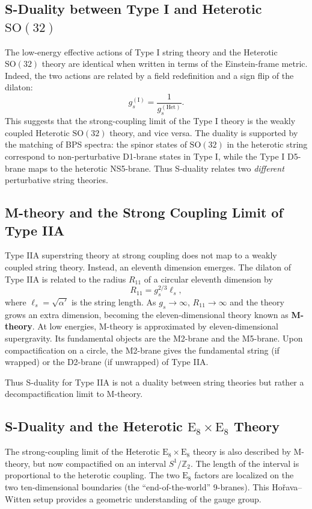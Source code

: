 \documentclass[11pt]{article}
\begin{document}
\subsection{S-Duality between Type I and Heterotic $\mathrm{SO}(32)$}
The low-energy effective actions of Type I string theory and the Heterotic $\mathrm{SO}(32)$ theory are identical when written in terms of the Einstein-frame metric. Indeed, the two actions are related by a field redefinition and a sign flip of the dilaton:
\begin{equation}
    g_s^{\mathrm{(I)}} = \frac{1}{g_s^{\mathrm{(Het)}}}.
\end{equation}
This suggests that the strong-coupling limit of the Type I theory is the weakly coupled Heterotic $\mathrm{SO}(32)$ theory, and vice versa. The duality is supported by the matching of BPS spectra: the spinor states of $\mathrm{SO}(32)$ in the heterotic string correspond to non-perturbative D1-brane states in Type I, while the Type I D5-brane maps to the heterotic NS5-brane. Thus S-duality relates two \textit{different} perturbative string theories.

\subsection{M-theory and the Strong Coupling Limit of Type IIA}
Type IIA superstring theory at strong coupling does not map to a weakly coupled string theory. Instead, an eleventh dimension emerges. The dilaton of Type IIA is related to the radius $R_{11}$ of a circular eleventh dimension by
\begin{equation}
    R_{11} = g_s^{2/3} \ell_s,
\end{equation}
where $\ell_s = \sqrt{\alpha'}$ is the string length. As $g_s \to \infty$, $R_{11} \to \infty$ and the theory grows an extra dimension, becoming the eleven-dimensional theory known as \textbf{M-theory}. At low energies, M-theory is approximated by eleven-dimensional supergravity. Its fundamental objects are the M2-brane and the M5-brane. Upon compactification on a circle, the M2-brane gives the fundamental string (if wrapped) or the D2-brane (if unwrapped) of Type IIA.

Thus S-duality for Type IIA is not a duality between string theories but rather a decompactification limit to M-theory.

\subsection{S-Duality and the Heterotic $\mathrm{E}_8\times\mathrm{E}_8$ Theory}
The strong-coupling limit of the Heterotic $\mathrm{E}_8\times\mathrm{E}_8$ theory is also described by M-theory, but now compactified on an interval $S^1/\mathbb{Z}_2$. The length of the interval is proportional to the heterotic coupling. The two $\mathrm{E}_8$ factors are localized on the two ten-dimensional boundaries (the ``end-of-the-world'' 9-branes). This Ho\v{r}ava--Witten setup provides a geometric understanding of the gauge group.
\end{document}
